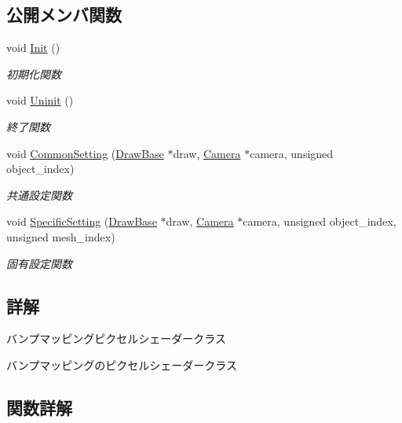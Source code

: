 \subsection*{公開メンバ関数}
\begin{DoxyCompactItemize}
\item 
void \mbox{\hyperlink{class_pixel_shader_bump_mapping_ab7807b7c56242e965ddb23e66e1a5d9e}{Init}} ()
\begin{DoxyCompactList}\small\item\em 初期化関数 \end{DoxyCompactList}\item 
void \mbox{\hyperlink{class_pixel_shader_bump_mapping_a004f731db6dab6b59949baed4a5a32d7}{Uninit}} ()
\begin{DoxyCompactList}\small\item\em 終了関数 \end{DoxyCompactList}\item 
void \mbox{\hyperlink{class_pixel_shader_bump_mapping_af62a2b40930533a3bae17319f876705d}{Common\+Setting}} (\mbox{\hyperlink{class_draw_base}{Draw\+Base}} $\ast$draw, \mbox{\hyperlink{class_camera}{Camera}} $\ast$camera, unsigned object\+\_\+index)
\begin{DoxyCompactList}\small\item\em 共通設定関数 \end{DoxyCompactList}\item 
void \mbox{\hyperlink{class_pixel_shader_bump_mapping_afa80c2404b490a444d54cc47c681ca8f}{Specific\+Setting}} (\mbox{\hyperlink{class_draw_base}{Draw\+Base}} $\ast$draw, \mbox{\hyperlink{class_camera}{Camera}} $\ast$camera, unsigned object\+\_\+index, unsigned mesh\+\_\+index)
\begin{DoxyCompactList}\small\item\em 固有設定関数 \end{DoxyCompactList}\end{DoxyCompactItemize}


\subsection{詳解}
バンプマッピングピクセルシェーダークラス 

バンプマッピングのピクセルシェーダークラス 

\subsection{関数詳解}
\mbox{\label{class_pixel_shader_bump_mapping_af62a2b40930533a3bae17319f876705d}} 
